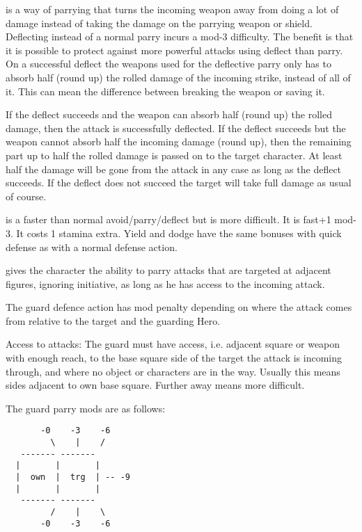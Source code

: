  is a way of parrying that turns the incoming weapon away from doing a lot of damage instead of taking the damage on the parrying weapon or shield. Deflecting instead of a normal parry incurs a mod-3 difficulty. The benefit is that it is possible to protect against more powerful attacks using deflect than parry. On a successful deflect the weapons used for the deflective parry only has to absorb half (round up) the rolled damage of the incoming strike, instead of all of it. This can mean the difference between breaking the weapon or saving it.

If the deflect succeeds and the weapon can absorb half (round up) the rolled damage, then the attack is successfully deflected. If the deflect succeeds but the weapon cannot absorb half the incoming damage (round up), then the remaining part up to half the rolled damage is passed on to the target character. At least half the damage will be gone from the attack in any case as long as the deflect succeeds. If the deflect does not succeed the target will take full damage as usual of course.


 is a faster than normal avoid/parry/deflect but is more difficult. It is fast+1 mod-3. It costs 1 stamina extra.
Yield and dodge have the same bonuses with quick defense as with a normal defense action.


 gives the character the ability to parry attacks that are targeted at adjacent figures, ignoring initiative, as long as he has access to the incoming attack.

The guard defence action has mod penalty depending on where the attack comes from relative to the target and the guarding Hero.

Access to attacks: The guard must have access, i.e. adjacent square or weapon with enough reach, to the base square side of the target the attack is incoming through, and where no object or characters are in the way. Usually this means sides adjacent to own base square. Further away means more difficult.

The guard parry mods are as follows:
\begin{samepage} \small \begin{verbatim}
       -0    -3    -6
         \    |    /
   ------- -------
  |       |       |
  |  own  |  trg  | -- -9
  |       |       |
   ------- -------
         /    |    \
       -0    -3    -6
\end{verbatim} \normalsize \end{samepage}

